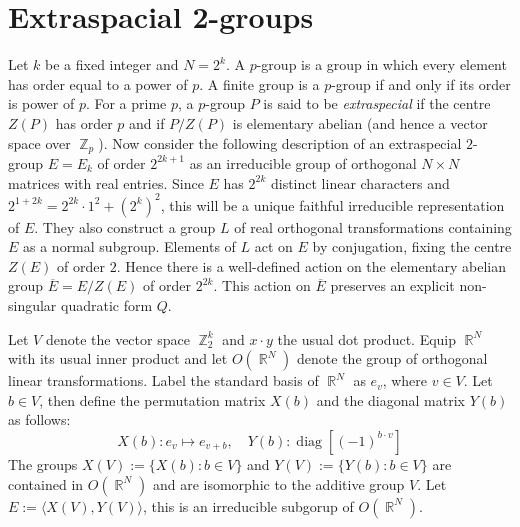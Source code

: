 \documentclass[a4paper]{article}
\DeclareMathOperator{\R}{\mathbb{R}}
\DeclareMathOperator{\Z}{\mathbb{Z}}
\DeclareMathOperator{\diag}{diag}
\begin{document}
  \section{Extraspacial 2-groups}

  Let $k$ be a fixed integer and $N = 2^{k}$. A $p$-group is
  a group in which every element has order equal to a power
  of $p$. A finite group is a $p$-group if and only if its
  order is power of $p$. For a prime $p$, a $p$-group $P$ is
  said to be \textit{extraspecial} if the centre $Z(P)$ has
  order $p$ and if $P / Z(P)$ is elementary abelian (and
  hence a vector space over $\Z_p$). Now consider the
  following description of an extraspecial $2$-group $E =
  E_k$ of order $2^{2k+1}$ as an irreducible group of
  orthogonal $N \times N$ matrices with real entries. Since
  $E$ has $2^{2k}$ distinct linear characters and $2^{1+2k}
  = 2^{2k} \cdot 1^2 + (2^{k})^2$, this will be a unique
  faithful irreducible representation of $E$. They also
  construct a group $L$ of real orthogonal transformations
  containing $E$ as a normal subgroup. Elements of $L$ act
  on $E$ by conjugation, fixing the centre $Z(E)$ of order
  $2$. Hence there is a well-defined action on the
  elementary abelian group $\overline{E} = E / Z(E)$ of
  order $2^{2k}$. This action on $\overline{E}$ preserves an
  explicit non-singular quadratic form $Q$.

  Let $V$ denote the vector space $\Z_2^{k}$ and $x \cdot
  y$ the usual dot product. Equip $\R^{N}$ with its usual
  inner product and let $O(\R^{N})$ denote the group of
  orthogonal linear transformations. Label the standard
  basis of $\R^{N}$ as $e_v$, where $v \in V$. Let $b \in
  V$, then define the permutation matrix $X(b)$ and the
  diagonal matrix $Y(b)$ as follows:
  \begin{equation}
    X(b) : e_v \mapsto e_{v+b},
    \quad
    Y(b) : \diag[(-1)^{b \cdot v}]
  \end{equation}
  The groups $X(V) := \{X(b) : b \in V\}$ and $Y(V) :=
  \{Y(b) : b \in V\}$ are contained in $O(\R^{N})$ and are
  isomorphic to the additive group $V$. Let $E := \langle
  X(V) ,Y(V) \rangle$, this is an irreducible subgorup of
  $O(\R^{N})$.
  
\end{document}
